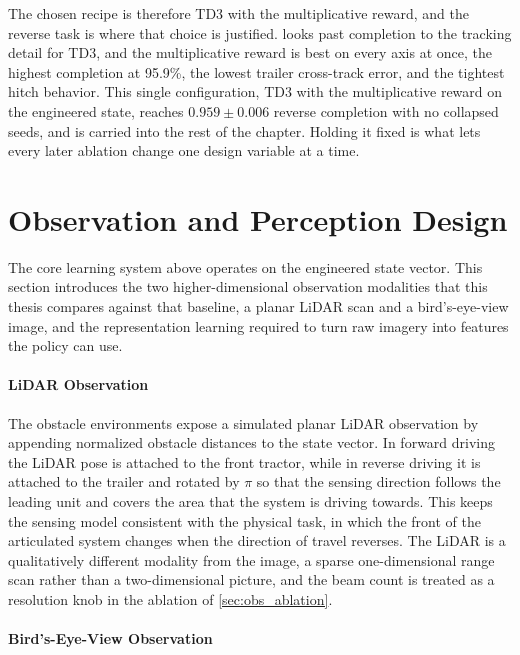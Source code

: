 The chosen recipe is therefore TD3 with the multiplicative reward, and the reverse task is where that choice is justified.  looks past completion to the tracking detail for TD3, and the multiplicative reward is best on every axis at once, the highest completion at 95.9\%, the lowest trailer cross-track error, and the tightest hitch behavior. This single configuration, TD3 with the multiplicative reward on the engineered state, reaches $0.959 \pm 0.006$ reverse completion with no collapsed seeds, and is carried into the rest of the chapter. Holding it fixed is what lets every later ablation change one design variable at a time.



\section{Observation and Perception Design}
\label{sec:perception}

The core learning system above operates on the engineered state vector. This section introduces the two higher-dimensional observation modalities that this thesis compares against that baseline, a planar LiDAR scan and a bird's-eye-view image, and the representation learning required to turn raw imagery into features the policy can use.

\paragraph{LiDAR Observation}

The obstacle environments expose a simulated planar LiDAR observation by appending normalized obstacle distances to the state vector. In forward driving the LiDAR pose is attached to the front tractor, while in reverse driving it is attached to the trailer and rotated by $\pi$ so that the sensing direction follows the leading unit and covers the area that the system is driving towards. This keeps the sensing model consistent with the physical task, in which the front of the articulated system changes when the direction of travel reverses. The LiDAR is a qualitatively different modality from the image, a sparse one-dimensional range scan rather than a two-dimensional picture, and the beam count is treated as a resolution knob in the ablation of \cref{sec:obs_ablation}.

\paragraph{Bird's-Eye-View Observation}

